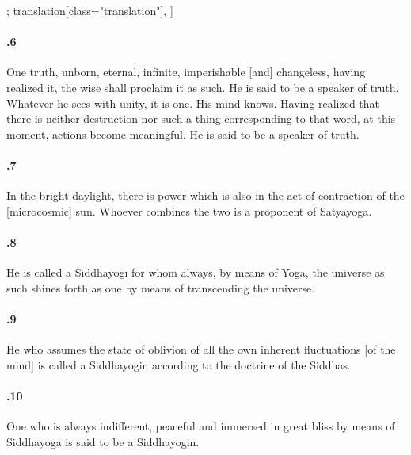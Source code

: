 \begin{alignment}[
  texts=edition[class="edition"];
  translation[class="translation"],
  ]
\begin{translation}
\begin{tlate}
      \paragraph{.6} One truth, unborn, eternal, infinite, imperishable [and] changeless, having realized it, the wise shall proclaim it as such. He is said to be a speaker of truth.\\
      
      Whatever he sees with unity, it is one. His mind knows. Having realized that there is neither destruction nor such a thing corresponding to that word, at this moment, actions become meaningful. He is said to be a speaker of truth.

      \paragraph{.7} In the bright daylight, there is power which is also in the act of contraction of the [microcosmic] sun. Whoever combines the two is a proponent of Satyayoga.

      \paragraph{.8} He is called a Siddhayogī for whom always, by means of Yoga, the universe as such shines forth as one by means of transcending the universe.

      \paragraph{.9} He who assumes the state of oblivion of all the own inherent fluctuations [of the mind] is called a Siddhayogin according to the doctrine of the Siddhas.

      \paragraph{.10} One who is always indifferent, peaceful and immersed in great bliss by means of Siddhayoga is said to be a Siddhayogin.
    \end{tlate}
  \end{translation}
\end{alignment}
\pagebreak %

